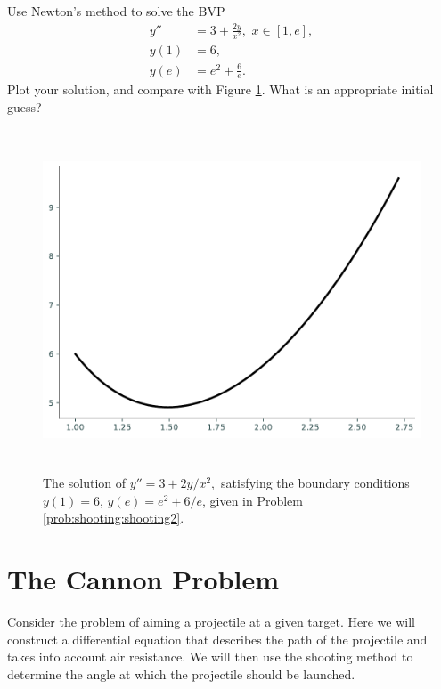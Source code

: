 \begin{problem}
\label{prob:shooting:shooting2}
Use Newton's method to solve the BVP
\begin{equation*}
\begin{split}
y'' &= 3 + \frac{2y}{x^2}, \,\, x \in [1,e],\\
y(1) &= 6, \\
y(e) &= e^2 + \frac{6}{e}.
\end{split}
\end{equation*}
Plot your solution, and compare with Figure \ref{fig:shooting:shooting2}.
What is an appropriate initial guess?

\end{problem}

\begin{figure}[h]
\includegraphics[height=4in]{figures/problem2.pdf}
\caption{The solution of  $y'' = 3 + 2y/x^2,$ satisfying the boundary conditions $y(1) = 6$, $ y(e) =  e^2 + 6/e$, given in Problem \ref{prob:shooting:shooting2}.}
\label{fig:shooting:shooting2}
\end{figure}

\section*{The Cannon Problem}

Consider the problem of aiming a projectile at a given target.
Here we will construct a differential equation that describes the path of the projectile and takes into account air resistance.
We will then use the shooting method to determine the angle at which the projectile should be launched.

